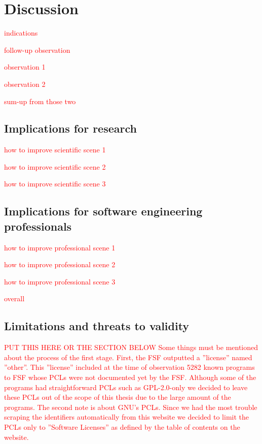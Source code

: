 \chapter{Discussion\label{discussion}}

\textcolor{red}{indications}

\textcolor{red}{follow-up observation}

\textcolor{red}{observation 1}

\textcolor{red}{observation 2}

\textcolor{red}{sum-up from those two}


\section{Implications for research}

\textcolor{red}{how to improve scientific scene 1}

\textcolor{red}{how to improve scientific scene 2}

\textcolor{red}{how to improve scientific scene 3}


\section{Implications for software engineering professionals}

\textcolor{red}{how to improve professional scene 1}

\textcolor{red}{how to improve professional scene 2}

\textcolor{red}{how to improve professional scene 3}

\textcolor{red}{overall}


\section{Limitations and threats to validity}

\textcolor{red}{PUT THIS HERE OR THE SECTION BELOW Some things must be mentioned about the process of the first stage. First, the FSF outputted a ''license'' named ''other''. This ''license'' included at the time of observation 5282 known programs to FSF whose PCLs were not documented yet by the FSF. Although some of the programs had straightforward PCLs such as GPL-2.0-only we decided to leave these PCLs out of the scope of this thesis due to the large amount of the programs. The second note is about GNU's PCLs. Since we had the most trouble scraping the identifiers automatically from this website we decided to limit the PCLs only to ''Software Licenses'' as defined by the table of contents on the website. }

